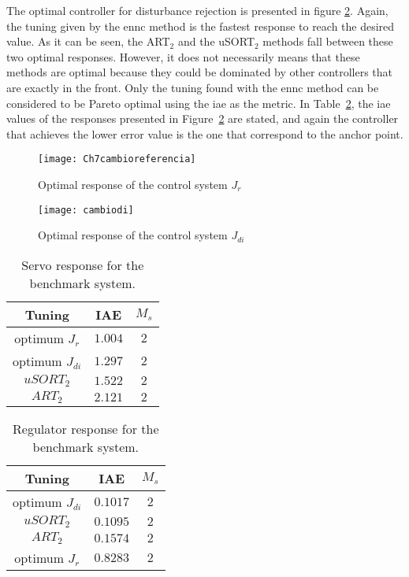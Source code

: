 The optimal controller for disturbance rejection is presented in figure \ref{fig:cambiodi}. Again, the tuning given by the \gls{ennc} method is the fastest response to reach the desired value. As it can be seen, the ART$_2$ and the uSORT$_{2}$ methods fall between these two optimal responses. However, it does not necessarily means that these methods are optimal because they could be dominated by other controllers that are exactly in the front. Only the tuning found with the \gls{ennc} method can be considered to be Pareto optimal using the \gls{iae} as the metric. In Table~\ref{tab:IAEdi}, the \gls{iae} values of the responses presented in Figure~\ref{fig:cambiodi} are stated, and again the controller that achieves the lower error value is the one that correspond to the anchor point.
\begin{figure}[tb]%
	\centering
	\texttt{[image: Ch7cambioreferencia]}%
	\caption{Optimal response of the control system $J_r$}%
	\label{fig:Ch7cambioreferencia}%
\end{figure}
%
\begin{figure}[tb]%
	\centering
	\texttt{[image: cambiodi]}%
	\caption{Optimal response of the control system $J_{di}$}%
	\label{fig:cambiodi}%
\end{figure}
%
\begin{table}[tb]
	\caption{Servo response for the benchmark system.}
	\centering
	\begin{tabular}{@{}*{3}{c}@{}}
		\toprule
		Tuning             &IAE        &$M_s$   \\
		\midrule              
		optimum $J_{r}$     &$1.004$   & $2$    \\
		optimum $J_{di}$    &$1.297$   & $2$    \\
		$uSORT_2$          &$1.522$   & $2$    \\
		$ART_2$          &$2.121$   & $2$    \\	
		\bottomrule				
	\end{tabular}
	\label{tab:IAEref}
\end{table}
%
\begin{table}[tb]
	\caption{Regulator response for the benchmark system.}
	\centering
	\begin{tabular}{@{}*{3}{c}@{}}
		\toprule
		Tuning            &IAE        &$M_s$   \\
		\midrule              
		optimum $J_{di}$   &$0.1017$   & $2$    \\
		$uSORT_2$          &$0.1095$   & $2$    \\
		$ART_2$            &$0.1574$    & $2$    \\	
		optimum $J_{r}$    &$0.8283$   & $2$    \\
		\bottomrule				
	\end{tabular}
	\label{tab:IAEdi}
\end{table}

